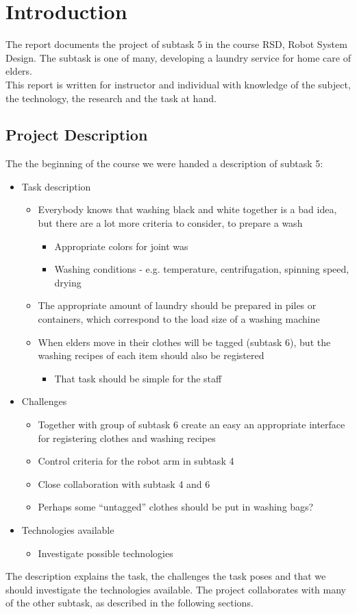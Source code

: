 \section{Introduction}

The report documents the project of subtask 5 in the course RSD, Robot System Design. The subtask is one of many, developing a laundry service for home care of elders. \\ This report is written for instructor and individual with knowledge of the subject, the technology, the research and the task at hand.

\subsection{Project Description}

The the beginning of the course we were handed a description of subtask 5:

\begin{itemize}
\item Task description
	\begin{itemize}
	\item Everybody knows that washing black and white together is a bad idea, but there are a lot more criteria to consider, to prepare a wash
		\begin{itemize}
		\item Appropriate colors for joint was
		\item Washing conditions - e.g. temperature, centrifugation, spinning speed, drying
		\end{itemize}
	\item The appropriate amount of laundry should be prepared in piles or containers, which correspond to the load size of a washing machine
	\item When elders move in their clothes will be tagged (subtask 6), but the washing recipes of each item should also be registered
		\begin{itemize}
		\item That task should be simple for the staff
		\end{itemize}
	\end{itemize}
\item Challenges
	\begin{itemize}
	\item Together with group of subtask 6 create an easy an appropriate interface for registering clothes and washing recipes
	\item Control criteria for the robot arm in subtask 4
	\item Close collaboration with subtask 4 and 6
	\item Perhaps some “untagged” clothes should be put in washing bags?
	\end{itemize}
\item Technologies available
	\begin{itemize}
	\item Investigate possible technologies
	\end{itemize}
\end{itemize}

The description explains the task, the challenges the task poses and that we should investigate the technologies available. The project collaborates with many of the other subtask, as described in the following sections.